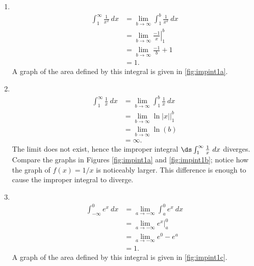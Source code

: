 {\begin{enumerate}
	\item	\mbox{}\\[-3\baselineskip]
	\begin{align*}
		\int_1^\infty \frac{1}{x^2}\ dx
		& = \lim_{b\to\infty} \int_1^b\frac1{x^2}\ dx \\
		& = \lim_{b\to\infty} \left.\frac{-1}{x}\right|_1^b \\ 
		&= \lim_{b\to\infty} \frac{-1}{b} + 1\\
		&= 1.
	\end{align*}
	A graph of the area defined by this integral is given in \autoref{fig:impint1a}.

	\item	\mbox{}\\[-3\baselineskip]
	\begin{align*}
		\int_1^\infty \frac1x\ dx
		& = \lim_{b\to\infty}\int_1^b\frac1x\ dx \\
		&= \lim_{b\to\infty} \ln |x|\Big|_1^b \\
		&= \lim_{b\to\infty} \ln (b)\\
		&= \infty.
	\end{align*}
	The limit does not exist, hence the improper integral $\ds\int_1^\infty\frac1x\ dx$ diverges. Compare the graphs in Figures \ref{fig:impint1a} and \ref{fig:impint1b}; notice how the graph of $f(x) = 1/x$ is noticeably larger. This difference is enough to cause the improper integral to diverge.

	\item	\mbox{}\\[-3\baselineskip]
	\begin{align*}
		\int_{-\infty}^0 e^x \ dx
		&= \lim_{a\to-\infty} \int_a^0e^x\ dx \\
		&=  \lim_{a\to-\infty} e^x\Big|_a^0 \\
		&= \lim_{a\to-\infty} e^0-e^a \\
		&= 1.
	\end{align*}
	A graph of the area defined by this integral is given in \autoref{fig:impint1c}.


\end{enumerate}}
